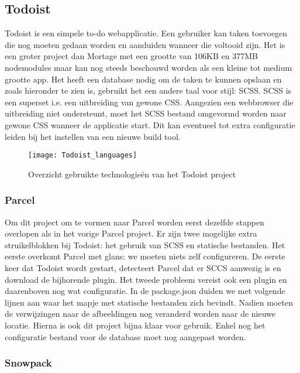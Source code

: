 \subsection{Todoist}

Todoist \autocite{hadwen-2021} is een simpele to-do webapplicatie. Een gebruiker kan taken toevoegen die nog moeten gedaan worden en aanduiden wanneer die voltooid zijn. Het is een groter project dan Mortage met een grootte van 106KB en 377MB nodemodules maar kan nog steeds beschouwd worden als een kleine tot medium grootte app. Het heeft een database nodig om de taken te kunnen opslaan en zoals hieronder te zien is, gebruikt het een andere taal voor stijl: SCSS. SCSS is een superset i.e. een uitbreiding van gewone CSS. Aangezien een webbrowser die uitbreiding niet ondersteunt, moet het SCSS bestand omgevormd worden naar gewone CSS wanneer de applicatie start. Dit kan eventueel tot extra configuratie leiden bij het instellen van een nieuwe build tool. 

\begin{figure}[h]
    \texttt{[image: Todoist\_languages]}
        \centering
        \caption{Overzicht gebruikte technologieën van het Todoist project}
    \end{figure}

\subsubsection{Parcel}

Om dit project om te vormen naar Parcel worden eerst dezelfde stappen overlopen als in het vorige Parcel project. Er zijn twee mogelijke extra struikelblokken bij Todoist: het gebruik van SCSS en statische bestanden. Het eerste overkomt Parcel met glans: we moeten niets zelf configureren. De eerste keer dat Todoist wordt gestart, detecteert Parcel dat er SCCS aanwezig is en download de bijhorende plugin. Het tweede probleem vereist ook een plugin en daarenboven nog wat configuratie. In de package.json duiden we met volgende lijnen aan waar het mapje met statische bestanden zich bevindt. Nadien moeten de verwijzingen naar de afbeeldingen nog veranderd worden naar de nieuwe locatie. Hierna is ook dit project bijna klaar voor gebruik. Enkel nog het configuratie bestand voor de database moet nog aangepast worden.

\subsubsection{Snowpack}

